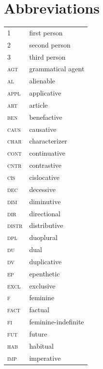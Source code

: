 \documentclass[output=paper,colorlinks,citecolor=brown]{langscibook}
\begin{document}
\section*{Abbreviations}
\begin{tabularx}{.45\textwidth}{lQ}
1 & first person \\
2 & second  person \\
3 & third person\\
\scshape agt & grammatical agent \\
\scshape al & alienable \\
\scshape appl & applicative\\ 
\scshape art & article \\
\scshape ben & benefactive \\
\scshape caus & causative \\
\scshape char & characterizer \\
\scshape cont & continuative \\
\scshape cntr & contrastive \\
\scshape cis & cislocative \\
\scshape dec & decessive \\
\scshape dim & diminutive \\
\scshape dir & directional \\
\scshape distr & distributive \\
\scshape dpl & duoplural \\
\scshape du & dual \\
\scshape dv & duplicative \\
\scshape ep & epenthetic \\
\scshape excl & exclusive \\
\scshape f & feminine \\
\scshape fact & factual \\
\scshape fi & feminine-indefinite \\
\scshape fut & future \\
\scshape hab & habitual \\
\scshape imp & imperative \\
\end{tabularx}
\end{document}
